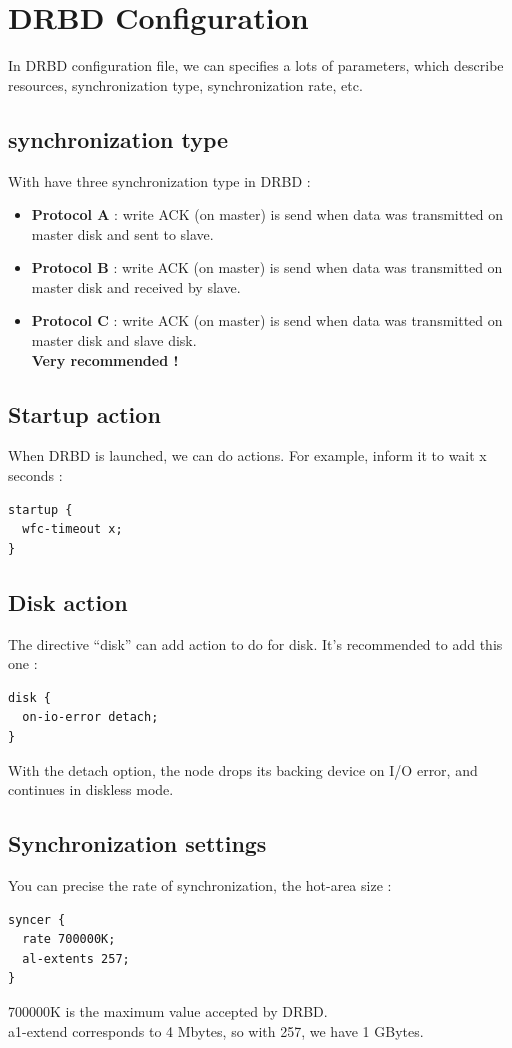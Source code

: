 \documentclass[a4paper,10pt]{report}
\begin{document}
\section{DRBD Configuration}
In DRBD configuration file, we can specifies a lots of parameters, which describe resources, synchronization type, synchronization rate, etc.
\subsection{synchronization type}
With have three synchronization type in DRBD :
\begin{itemize}
\item \textbf{Protocol A} : write ACK (on master) is send when data was transmitted on master disk and sent to slave.
\item \textbf{Protocol B} : write ACK (on master) is send when data was transmitted on master disk and received by slave.
\item \textbf{Protocol C} : write ACK (on master) is send when data was transmitted on master disk and slave disk.\\
\textbf{Very recommended !}
\end{itemize}

\subsection{Startup action}
When DRBD is launched, we can do actions. For example, inform it to wait x seconds :
\begin{lstlisting}
startup {
  wfc-timeout x;
}
\end{lstlisting}

\subsection{Disk action}
The directive ``disk'' can add action to do for disk. It's recommended to add this one :
\begin{lstlisting}
disk {
  on-io-error detach;
}
\end{lstlisting}
With the detach option, the node drops its backing device on I/O error, and continues in diskless mode.

\subsection{Synchronization settings}
You can precise the rate of synchronization, the hot-area size :
\begin{lstlisting}
syncer {
  rate 700000K;
  al-extents 257;
}
\end{lstlisting}
700000K is the maximum value accepted by DRBD.\\
a1-extend corresponds to 4 Mbytes, so with 257, we have 1 GBytes.
\end{document}
